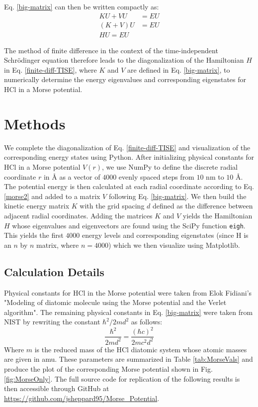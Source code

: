 \documentclass[%
aps, %
prl, %
preprint, %
12pt, %
amsfonts, %
amssymb, %
amsmath, %
endfloats,%
raggedbottom, %
]{revtex4-1}
\begin{document}
Eq. \ref{big-matrix} can then be written compactly as:
\begin{align}
    KU + VU &= EU \\
    (K + V)U &= EU \\ \label{finite-diff-TISE}
    HU = EU
\end{align}

The method of finite difference in the context of the time-independent Schrödinger equation
therefore leads to the diagonalization of the Hamiltonian $H$ in Eq. \ref{finite-diff-TISE}, where $K$ and $V$ are defined in Eq. \ref{big-matrix}, to numerically determine the energy eigenvalues
and corresponding eigenstates for HCl in a Morse potential.

\section{\label{sec:Method}Methods}
We complete the diagonalization of Eq. \ref{finite-diff-TISE} and visualization of the
corresponding energy states using Python. After initializing physical constants for HCl in a 
Morse potential $V(r)$, we use NumPy to define the discrete radial coordinate $r$ in Å as a
vector of $4000$ evenly spaced steps from $10$ nm to $10$ Å. The potential energy is then
calculated at each radial coordinate according to Eq. \ref{morse2} and added to a matrix $V$
following Eq. \ref{big-matrix}. We then build the kinetic energy matrix $K$ with the grid spacing
$d$ defined as the difference between adjacent radial coordinates. Adding the matrices $K$ and
$V$ yields the Hamiltonian $H$ whose eigenvalues and eigenvectors are found using the SciPy
function \texttt{eigh}. This yields the first $4000$ energy levels and corresponding eigenstates
(since H is an $n$ by $n$ matrix, where $n = 4000$) which we then visualize using Matplotlib.


\subsection{\label{ssec:measdet}Calculation Details}
Physical constants for HCl in the Morse potential were taken from Elok Fidiani's "Modeling of 
diatomic molecule using the Morse potential and the Verlet algorithm". The remaining physical
constants in Eq. \ref{big-matrix} were taken from NIST by rewriting the constant $\hbar^2/2md^2$ as follows:
\begin{equation}
    \frac{\hbar^2}{2md^2} = \frac{(\hbar c)^2}{2mc^2d^2}
\end{equation}
Where $m$ is the reduced mass of the HCl diatomic system whose atomic masses are given in amu.
These parameters are summarized in Table \ref{tab:MorseVals} and produce the plot of the
corresponding Morse potential shown in Fig. \ref{fig:MorseOnly}. The full source code for
replication of the following results is then accessible through GitHub at
\href{https://github.com/jsheppard95/Morse_Potential}{https://github.com/jsheppard95/Morse\_Potential}.
\end{document}
